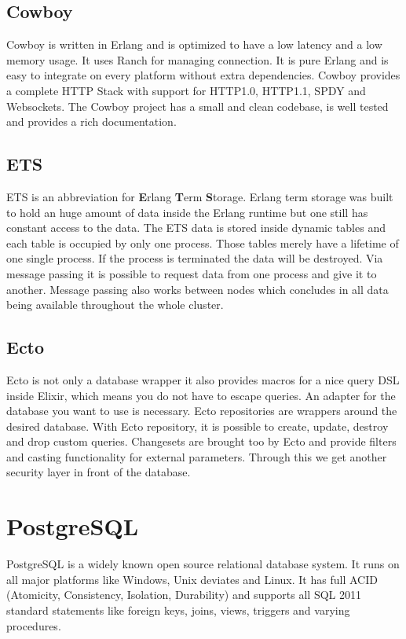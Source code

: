 \subsection{Cowboy}
Cowboy is written in Erlang and is optimized to have a low latency and a low memory usage. It uses Ranch for managing connection. It is pure Erlang and is easy to integrate on every platform without extra dependencies. Cowboy provides a complete HTTP Stack with support for HTTP1.0, HTTP1.1, SPDY and Websockets. The Cowboy project has a small and clean codebase, is well tested and provides a rich documentation.

\subsection{ETS}
ETS is an abbreviation for \textbf{E}rlang \textbf{T}erm \textbf{S}torage. Erlang term storage was built to hold an huge amount of data inside the Erlang runtime but one still has constant access to the data. The ETS data is stored inside dynamic tables and each table is occupied by only one process. Those tables merely have a lifetime of one single process. If the process is terminated the data will be destroyed. Via message passing it is possible to request data from one process and give it to another. Message passing also works between nodes which concludes in all data being available throughout the whole cluster. 

\subsection{Ecto}
Ecto is not only a database wrapper it also provides macros for a nice query DSL inside Elixir, which means you do not have to escape queries. An adapter for the database you want to use is necessary. Ecto repositories are wrappers around the desired database. With Ecto repository, it is possible to create, update, destroy and drop custom queries.  Changesets are brought too by Ecto and provide filters and casting functionality for external parameters. Through this we get another security layer in front of the database.

\section{PostgreSQL}
PostgreSQL is a widely known open source relational database system. It runs on all major platforms like Windows, Unix deviates and Linux. It has full ACID (Atomicity, Consistency, Isolation, Durability) and supports all SQL 2011 standard statements like foreign keys, joins, views, triggers and varying procedures. 

